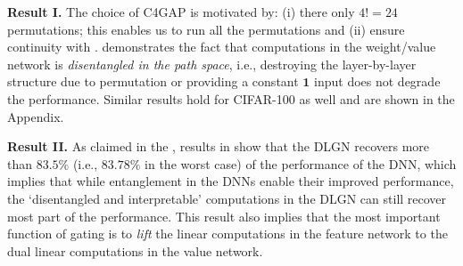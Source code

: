\textbf{Result I.} The choice of C4GAP is motivated by: (i) there only $4!=24$ permutations; this enables us to run all the permutations and (ii) ensure continuity with \citep{arora2019exact,npk}.   demonstrates the fact that computations in the weight/value network is \emph{disentangled in the path space}, i.e., destroying the layer-by-layer structure due to permutation or providing a constant $\mathbf{1}$ input does not degrade the performance.  Similar results hold for CIFAR-100 as well and are shown in the Appendix.

\textbf{Result II.} As claimed in the , results in  show that the DLGN recovers more than $83.5\%$ (i.e., $83.78\%$ in the worst case) of the performance of the DNN, which implies that while entanglement in the DNNs enable their improved performance,  the `disentangled and interpretable'  computations in the DLGN can still recover most part of the performance. This result also implies that the most important function of gating is to \emph{lift} the linear computations in the feature network to the dual linear computations in the value network.






 




